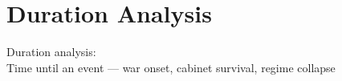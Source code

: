 


\section{Duration Analysis}

\begin{transitionframe}
Duration analysis:\\[6pt]
{\large Time until an event --- war onset, cabinet survival, regime collapse}
\end{transitionframe}
\note{}

